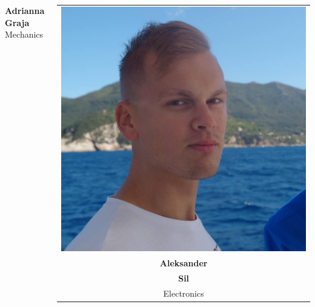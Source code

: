\documentclass[xcolor=dvipsnames]{beamer}%
\begin{document}
\begin{frame}
\begin{columns}
\begin{minipage}[c][0.3\textheight][c]{\linewidth}
    \textbf{Adrianna}\\\textbf{Graja}\\
    Mechanics
  
\end{minipage}

\begin{minipage}[c][0.45\textheight][c]{\linewidth}
  \centering
    \begin{table}[H]
    \centering
    \begin{tabular}{c}
    \includegraphics[height=0.2\textheight]{figure/aleksander_sil.jpg}\\
    \textbf{Aleksander}\\\textbf{Sil}\\
    Electronics
    \end{tabular}
    \end{table}
\end{minipage}
\begin{minipage}[c][0.3\textheight][c]{\linewidth}
  \centering

\end{minipage}
\end{columns}
\end{frame}
\end{document}
